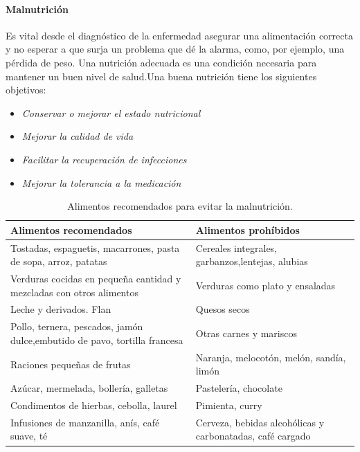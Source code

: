 \documentclass[a4paper,twocolumn,10pt]{article}
\begin{document}
\paragraph{Malnutrición}
Es vital desde el diagnóstico de la enfermedad asegurar una alimentación correcta y no esperar a que surja un problema que dé la alarma, como, por
ejemplo, una pérdida de peso. Una nutrición adecuada es una condición necesaria para mantener un buen nivel de salud.Una buena nutrición tiene los siguientes objetivos\cite{Herrera2004}:
\begin{itemize}
\item{\mdseries \itshape Conservar o mejorar el estado nutricional}
\item{\mdseries \itshape Mejorar la calidad de vida}
\item{\mdseries \itshape Facilitar la recuperación de infecciones}
\item{\mdseries \itshape Mejorar la tolerancia a la medicación}
\end{itemize}
\begin{table}[htb]
\begin{center}
\begin{tabular}{|p{}|p{}|}
\hline \hline
{\cellcolor[gray]{0.7} \bfseries Alimentos recomendados} & {\cellcolor[gray]{0.7} \bfseries  Alimentos prohíbidos} \\ \hline \hline
Tostadas, espaguetis, macarrones, pasta de sopa, arroz, patatas & Cereales integrales, garbanzos,lentejas, alubias \\ \hline
Verduras cocidas en pequeña cantidad y mezcladas con otros alimentos & Verduras como plato y ensaladas \\ \hline
Leche y derivados. Flan & Quesos secos\\ \hline
Pollo, ternera, pescados, jamón dulce,embutido de pavo, tortilla francesa & Otras carnes y mariscos\\ \hline
Raciones pequeñas de frutas & Naranja, melocotón, melón,
sandía, limón \\ \hline
Azúcar, mermelada, bollería, galletas & Pastelería, chocolate \\ \hline
Condimentos de hierbas, cebolla,
laurel & Pimienta, curry \\ \hline
Infusiones de manzanilla, anís,
café suave, té & Cerveza, bebidas alcohólicas
y carbonatadas, café cargado\\ \hline
\end{tabular}
\caption{Alimentos recomendados para evitar la malnutrición. \cite{Herrera2004}}
\label{tabla:Alimentos}
\end{center}
\end{table}
\end{document}
